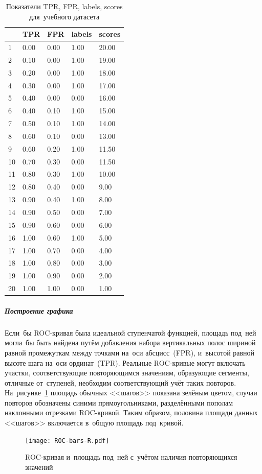 \documentclass[]{scrreprt}
\begin{document}
\begin{table}[ht]
	\caption{Показатели TPR, FPR, labels, scores для~учебного датасета}\label{tab:roc_df-r}
	\centering
	\begin{tabular}{lllll}
		\hline
		& TPR & FPR & labels & scores \\ 
		\hline
		1 & 0.00 & 0.00 & 1.00 & 20.00 \\ 
		2 & 0.10 & 0.00 & 1.00 & 19.00 \\ 
		3 & 0.20 & 0.00 & 1.00 & 18.00 \\ 
		4 & 0.30 & 0.00 & 1.00 & 17.00 \\ 
		5 & 0.40 & 0.00 & 0.00 & 16.00 \\ 
		6 & 0.40 & 0.10 & 1.00 & 15.00 \\ 
		7 & 0.50 & 0.10 & 1.00 & 14.00 \\ 
		8 & 0.60 & 0.10 & 0.00 & 13.00 \\ 
		9 & 0.60 & 0.20 & 1.00 & 11.50 \\ 
		10 & 0.70 & 0.30 & 0.00 & 11.50 \\ 
		11 & 0.80 & 0.30 & 1.00 & 10.00 \\ 
		12 & 0.80 & 0.40 & 0.00 & 9.00 \\ 
		13 & 0.90 & 0.40 & 1.00 & 8.00 \\ 
		14 & 0.90 & 0.50 & 0.00 & 7.00 \\ 
		15 & 0.90 & 0.60 & 0.00 & 6.00 \\ 
		16 & 1.00 & 0.60 & 1.00 & 5.00 \\ 
		17 & 1.00 & 0.70 & 0.00 & 4.00 \\ 
		18 & 1.00 & 0.80 & 0.00 & 3.00 \\ 
		19 & 1.00 & 0.90 & 0.00 & 2.00 \\ 
		20 & 1.00 & 1.00 & 0.00 & 1.00 \\ 
		\hline
	\end{tabular}
\end{table}
%
\subparagraph{Построение графика}
Если~бы ROC-кривая была идеальной ступенчатой функцией, площадь под~ней могла~бы быть найдена путём добавления набора вертикальных полос шириной равной промежуткам между точками на~оси абсцисс~(FPR), и~высотой равной высоте шага на~оси ординат~(TPR). Реальные ROC-кривые могут включать участки, соответствующие повторяющимся значениям, образующие сегменты, отличные от~ступеней, необходим соответствующий учёт таких повторов. На~рисунке~\ref{fig:ROC-bars-R} площадь обычных <<шагов>> показана зелёным цветом, случаи повторов обозначены синими прямоугольниками, разделёнными пополам наклонными отрезками ROC-кривой. Таким образом, половина площади данных <<шагов>> включается в~общую площадь под~кривой.
%
\begin{figure}[ht]
	\centering
	\texttt{[image: ROC-bars-R.pdf]}
	\caption{ROC-кривая и~площадь под~ней с~учётом наличия повторяющихся значений}
	\label{fig:ROC-bars-R}
\end{figure}
%
\end{document}
